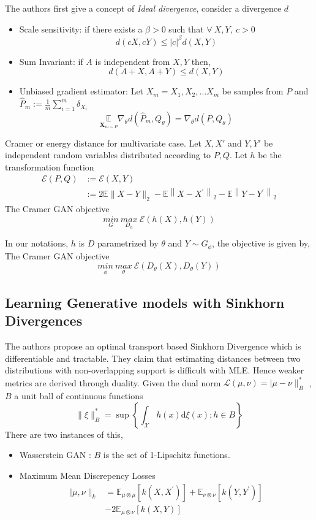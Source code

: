The authors first give a concept of \textit{Ideal divergence}, consider a divergence $d$
\begin{itemize}
    \item Scale sensitivity: if there exists a $\beta > 0$ such that    $\forall \ X, Y, \ c >0$ $$
d(c X, c Y) \leq|c|^{\beta}d(X, Y)
$$
\item Sum Invariant: if $A$ is independent from $X, Y$ then, $$
d(A+X, A+Y) \leq d(X, Y)
$$
\item Unbiased gradient estimator: Let $X_m =  X_1, X_2, \ldots X_m$ be samples from $P$ and $\hat{P}_m := \frac{1}{m}\sum_{i=1}^m \delta_{X_i}$
$$
\underset{\mathbf{X}_{m \sim P}}{\mathbb{E}} \nabla_{\theta} d\left(\hat{P}_{m}, Q_{\theta}\right)=\nabla_{\theta} d\left(P, Q_{\theta}\right)
$$
\end{itemize}{}
Cramer or energy distance for multivariate case. Let $X, X'$ and $Y, Y'$ be independent random variables distributed according to $P, Q$. Let $h$ be the transformation function
\begin{equation}
\label{eq:eg}
\begin{aligned}
\mathcal{E}(P, Q) &:=\mathcal{E}(X, Y) \\
&:=2 \mathbb{E}\|X-Y\|_{2}-\mathbb{E}\left\|X-X^{\prime}\right\|_{2}-\mathbb{E}\left\|Y-Y^{\prime }\right\|_{2}
\end{aligned}{}
\end{equation}
The Cramer GAN objective
$$\underset{G}{min} \ \underset{D_h}{max}\ \mathcal{E}(h(X), h(Y))  $$

In our notations, $h$ is $D$ parametrized by $\theta$ and $Y \sim G_{\phi}$, the objective is given by,
The Cramer GAN objective
$$\underset{\phi}{min} \ \underset{\theta}{max}\ \mathcal{E}(D_{\theta}(X), D_{\theta}(Y))  $$

\subsection*{Learning Generative models with Sinkhorn Divergences \citep{sinkhorn}}
The authors propose an optimal transport based Sinkhorn Divergence which is differentiable and tractable. They claim that estimating distances between two distributions with non-overlapping support is difficult with MLE. Hence weaker metrics are derived through duality. Given the dual norm $\mathcal{L}(\mu, \nu)=| \mu-\nu \|_{B}^{*}$ , $B$ a unit ball of continuous functions
    $$
\|\xi\|_{B}^{*}=\sup \left\{\int_{\mathcal{X}} h(x) \mathrm{d} \xi(x) ; h \in B\right\}
$$
There are two instances of this,
\begin{itemize}
    \item Wasserstein GAN : $B$ is the set of 1-Lipschitz functions.
    \item Maximum Mean Discrepency Losses
    $$
\begin{aligned} | \mu, \nu \|_{k} &=\mathbb{E}_{\mu \otimes \mu}\left[k\left(X, X^{\prime}\right)\right]+\mathbb{E}_{\nu \otimes \nu}\left[k\left(Y, Y^{\prime}\right)\right] \\ &-2 \mathbb{E}_{\mu \otimes \nu}[k(X, Y)] \end{aligned}
$$
\end{itemize}{}

